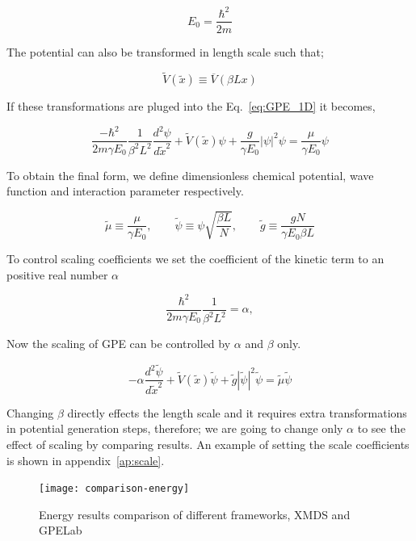 \documentclass[a4paper,times,hidelinks,12pt]{article}
\begin{document}
$$E_0 = \frac{\hbar^2}{2m} $$

\noindent The potential can also be transformed in length scale such that; 

$$ \widetilde{V}(\widetilde{x}) \equiv \overline{V}(\beta L x) $$ 

\noindent If these transformations are pluged into the Eq.~\eqref{eq:GPE_1D} it becomes,

\begin{equation}
    \label{eq:GPE_1D_dimensionless_en_len}
    \frac{-\hbar^2}{2m\gamma E_0} \frac{1}{\beta^2 L^2}  \frac{d^2\psi}{d \widetilde{x}^2} + \widetilde{V}(\widetilde{x})\psi + \frac{g}{\gamma E_0}|\psi|^2\psi = \frac{\mu}{\gamma E_0}\psi
\end{equation}

\noindent To obtain the final form, we define dimensionless chemical potential, wave function and interaction parameter respectively. 

$$\widetilde{\mu} \equiv \frac{\mu}{\gamma E_0}, \qquad \widetilde{\psi} \equiv \psi{\sqrt{\frac{\beta L}{N}}}, \qquad \widetilde{g} \equiv \frac{gN}{\gamma E_0 \beta L} $$

\noindent To control scaling coefficients we set the coefficient of the kinetic term to an positive real number $\alpha$  

$$ \frac{\hbar^2}{2m\gamma E_0} \frac{1}{\beta^2 L^2} = \alpha  , $$

\noindent Now the scaling of GPE can be controlled by $\alpha$ and $\beta$ only.

\begin{equation}
\label{eq:GPE_dimensionless}
    -\alpha\frac{d^2\widetilde{\psi}}{d\widetilde{x}^2} + \widetilde{V}(\widetilde{x})\widetilde{\psi} + \widetilde{g}|\widetilde{\psi}|^2 \widetilde{\psi} = \widetilde{\mu} \widetilde{\psi}
\end{equation}
    
Changing $\beta$ directly effects the length scale and it requires extra transformations in potential generation steps, therefore; we are going to change only $\alpha$ to see the effect of scaling by comparing results. An example of setting the scale coefficients is shown in appendix~\ref{ap:scale}.


\graphicspath{{"../figs/numericanalyze/"}}
\begin{figure}[H]
\centering
    \texttt{[image: comparison-energy]}
\caption{Energy results comparison of different frameworks, XMDS and GPELab}
\label{fig:dens_energy_error}
\end{figure}
\end{document}
